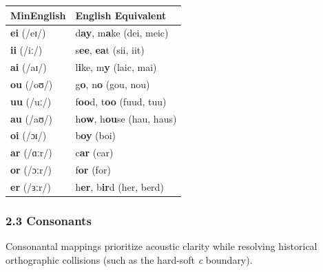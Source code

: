 {\def\LTcaptype{} %
\begin{longtable}[]{@{}ll@{}}
\toprule\noalign{}
MinEnglish & English Equivalent \\
\midrule\noalign{}
\endhead
\bottomrule\noalign{}
\endlastfoot
\textbf{ei} (/eɪ/) & d\textbf{ay}, m\textbf{a}ke (dei, meic) \\
\textbf{ii} (/iː/) & s\textbf{ee}, \textbf{ea}t (sii, iit) \\
\textbf{ai} (/aɪ/) & l\textbf{i}ke, m\textbf{y} (laic, mai) \\
\textbf{ou} (/oʊ/) & g\textbf{o}, n\textbf{o} (gou, nou) \\
\textbf{uu} (/uː/) & f\textbf{oo}d, t\textbf{oo} (fuud, tuu) \\
\textbf{au} (/aʊ/) & h\textbf{ow}, h\textbf{ou}se (hau, haus) \\
\textbf{oi} (/ɔɪ/) & b\textbf{oy} (boi) \\
\textbf{ar} (/ɑːr/) & c\textbf{ar} (car) \\
\textbf{or} (/ɔːr/) & f\textbf{or} (for) \\
\textbf{er} (/ɜːr/) & h\textbf{er}, b\textbf{ir}d (her, berd) \\
\end{longtable}
}

\subsubsection{2.3 Consonants}\label{consonants}

Consonantal mappings prioritize acoustic clarity while resolving
historical orthographic collisions (such as the hard-soft \emph{c}
boundary).


